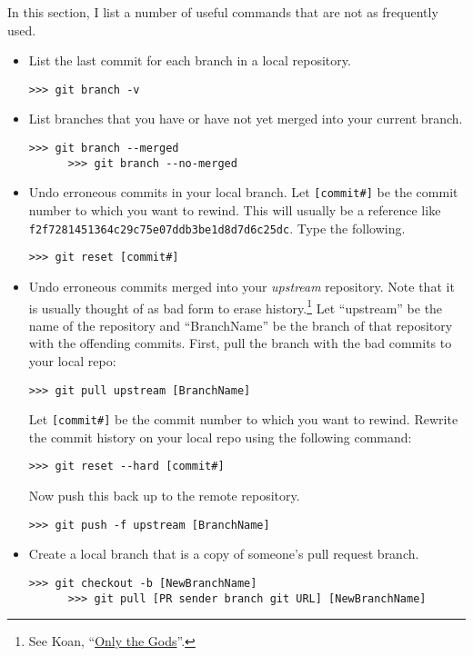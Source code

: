  In this section, I list a number of useful \git commands that are not as frequently used.
  \begin{itemize}
    \item List the last commit for each branch in a local repository.
    \begin{lstlisting}[frame=single]
      >>> git branch -v
    \end{lstlisting}
    \item List branches that you have or have not yet merged into your current branch.
    \begin{lstlisting}[frame=single]
      >>> git branch --merged
      >>> git branch --no-merged
    \end{lstlisting}
    \item Undo erroneous commits in your local branch. Let \texttt{[commit\#]} be the commit number to which you want to rewind. This will usually be a reference like \texttt{f2f7281451364c29c75e07ddb3be1d8d7d6c25dc}. Type the following.
    \begin{lstlisting}[frame=single]
      >>> git reset [commit#]
    \end{lstlisting}
    \item Undo erroneous commits merged into your \textit{upstream} repository. Note that it is usually thought of as bad form to erase \git history.\footnote{See \git Koan, ``\href{http://stevelosh.com/blog/2013/04/git-koans/}{Only the Gods}''.} Let ``upstream'' be the name of the repository and ``BranchName'' be the branch of that repository with the offending commits. First, pull the branch with the bad commits to your local repo:
    \begin{lstlisting}[frame=single]
      >>> git pull upstream [BranchName]
    \end{lstlisting}
    Let \texttt{[commit\#]} be the commit number to which you want to rewind. Rewrite the commit history on your local repo using the following command:
    \begin{lstlisting}[frame=single]
      >>> git reset --hard [commit#]
    \end{lstlisting}
    Now push this back up to the remote repository.
    \begin{lstlisting}[frame=single]
      >>> git push -f upstream [BranchName]
    \end{lstlisting}
    \item Create a local branch that is a copy of someone's pull request branch.
    \begin{lstlisting}[frame=single]
      >>> git checkout -b [NewBranchName]
      >>> git pull [PR sender branch git URL] [NewBranchName]
    \end{lstlisting}
  \end{itemize}


